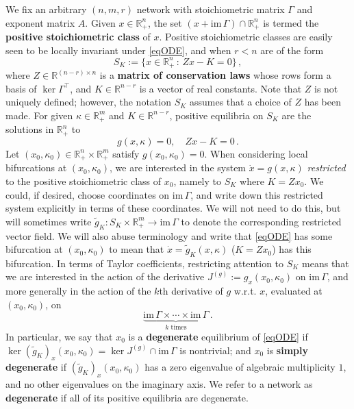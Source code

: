 \documentclass[11pt]{amsart}
\renewcommand{\k}{\kappa}
\newcommand{\R}{\mathbb{R}}
\theoremstyle{definition}
\begin{document}
We fix an arbitrary $(n,m,r)$ network with stoichiometric matrix $\Gamma$ and exponent matrix $A$. Given $x \in \R^n_+$, the set $(x+\mathrm{im}\,\Gamma) \cap \R^n_+$ is termed the {\bf positive stoichiometric class} of $x$. Positive stoichiometric classes are easily seen to be locally invariant under \eqref{eqODE}, and when $r<n$ are of the form
\begin{equation}\label{eq:Z1}
S_K:= \{x\in \R^n_+\,:\,Z x -K=0\}\,,
\end{equation}
where $Z\in \R^{(n-r) \times n}$ is a {\bf matrix of conservation laws} whose rows form a basis of $\ker\Gamma^\top$, and $K\in \R^{n-r}$ is a vector of real constants. Note that $Z$ is not uniquely defined; however, the notation $S_K$ assumes that a choice of $Z$ has been made. For given $\k \in \R^m_+$ and $K \in \R^{n-r}$, positive equilibria on $S_K$ are the solutions in $\R^n_+$ to 
\[
g(x,\k) = 0, \quad Zx-K = 0\,.
\]
Let $(x_0, \k_0) \in \R^n_+ \times \R^m_+$ satisfy $g(x_0,\k_0) = 0$. When considering local bifurcations at $(x_0, \k_0)$, we are interested in the system $\dot x = g(x,\k)$ {\em restricted} to the positive stoichiometric class of $x_0$, namely to $S_K$ where $K = Zx_0$. We could, if desired, choose coordinates on $\mathrm{im}\,\Gamma$, and write down this restricted system explicitly in terms of these coordinates. We will not need to do this, but will sometimes write $\tilde{g}_K\colon S_K \times \R^m_+ \to \mathrm{im}\,\Gamma$ to denote the corresponding restricted vector field. We will also abuse terminology and write that \eqref{eqODE} has some bifurcation at $(x_0, \k_0)$ to mean that $\dot x = \tilde{g}_K(x,\k)$ ($K= Zx_0$) has this bifurcation. In terms of Taylor coefficients, restricting attention to $S_K$ means that we are interested in the action of the derivative $J^{(g)}:=g_x(x_0,\k_0)$ on $\mathrm{im}\,\Gamma$, and more generally in the action of the $k$th derivative of $g$ w.r.t. $x$, evaluated at $(x_0, \k_0)$, on 
\[
\underbrace{\mathrm{im}\,\Gamma \times \cdots \times \mathrm{im}\,\Gamma}_{k \text{ times}}\,.
\]
In particular, we say that $x_0$ is a {\bf degenerate} equilibrium of \eqref{eqODE} if $\ker (\tilde{g}_K)_x(x_0, \k_0) = \ker J^{(g)} \cap \mathrm{im}\,\Gamma$ is nontrivial; and $x_0$ is {\bf simply degenerate} if $(\tilde{g}_K)_x(x_0, \k_0)$ has a zero eigenvalue of algebraic multiplicity $1$, and no other eigenvalues on the imaginary axis. We refer to a network as {\bf degenerate} if all of its positive equilibria are degenerate. 
\end{document}
